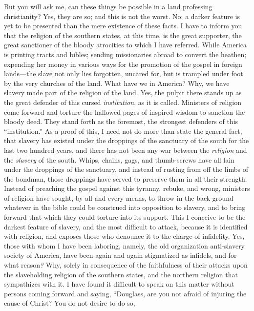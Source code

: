 But you will ask me, can these things be possible in a land professing
christianity? Yes, they are so; and this is not the worst. No; a darker
feature is yet to be presented than the mere existence of these facts. I
have to inform you that the religion of the southern states, at this
time, is the great supporter, the great sanctioner of the bloody
atrocities to which I have referred. While America is printing tracts
and bibles; sending missionaries abroad to convert the heathen;
expending her money in various ways for the promotion of the gospel in
foreign lands---the slave not only lies forgotten, uncared for, but is
trampled under foot by the very churches of the land. What have we in
America? Why, we have slavery made part of the religion of the land.
Yes, the pulpit there stands up as the great defender of this cursed
\emph{institution}, as it is called. Ministers of religion come forward
and torture the hallowed pages of inspired wisdom to sanction the bloody
deed. They stand forth as the foremost, the strongest defenders of this
``institution.'' As a proof of this, I need not do more than state the
general fact, that slavery has existed under the droppings of the
sanctuary of the south for the last two hundred years, and there has not
been any war between the \emph{religion} and the \emph{slavery} of the
south. Whips, chains, gags, and thumb-screws have all lain under the
droppings of the sanctuary, and instead of rusting from off the limbs of
the bondman, those droppings have served to preserve them in all their
strength. Instead of preaching the gospel against this tyranny, rebuke,
and wrong, ministers of religion have sought, by all and every means, to
throw in the back-ground whatever in the bible could be construed into
opposition to slavery, and to bring forward that which they could
torture into its support. This I conceive to be the darkest feature of
slavery, and the most difficult to attack, because it is identified with
religion, and exposes those who denounce it to the charge of infidelity.
Yes, those with whom I have been laboring, namely, the old organization
anti-slavery society of America, have been again and again stigmatized
as infidels, and for what reason\emph{?} Why, solely in consequence of
the faithfulness of their attacks upon the slaveholding religion of the
southern states, and the northern religion that sympathizes with it. I
have found it difficult to speak on this matter without persons coming
forward and {\protect\hypertarget{416}{}{}}saying, ``Douglass, are you
not afraid of injuring the cause of Christ? You do not desire to do so,
